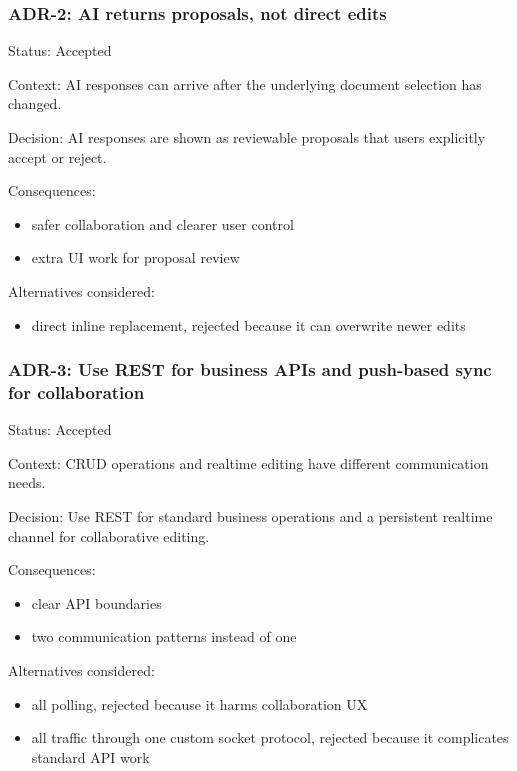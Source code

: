 \documentclass[a4paper]{article}
\providecommand{\tightlist}{%
  \setlength{\itemsep}{0pt}\setlength{\parskip}{0pt}}
\begin{document}
\subsubsection{ADR-2: AI returns proposals, not direct
edits}\label{adr-2-ai-returns-proposals-not-direct-edits}

Status: Accepted

Context: AI responses can arrive after the underlying document selection
has changed.

Decision: AI responses are shown as reviewable proposals that users
explicitly accept or reject.

Consequences:

\begin{itemize}
\tightlist
\item
  safer collaboration and clearer user control
\item
  extra UI work for proposal review
\end{itemize}

Alternatives considered:

\begin{itemize}
\tightlist
\item
  direct inline replacement, rejected because it can overwrite newer
  edits
\end{itemize}

\subsubsection{ADR-3: Use REST for business APIs and push-based sync for
collaboration}\label{adr-3-use-rest-for-business-apis-and-push-based-sync-for-collaboration}

Status: Accepted

Context: CRUD operations and realtime editing have different
communication needs.

Decision: Use REST for standard business operations and a persistent
realtime channel for collaborative editing.

Consequences:

\begin{itemize}
\tightlist
\item
  clear API boundaries
\item
  two communication patterns instead of one
\end{itemize}

Alternatives considered:

\begin{itemize}
\tightlist
\item
  all polling, rejected because it harms collaboration UX
\item
  all traffic through one custom socket protocol, rejected because it
  complicates standard API work
\end{itemize}
\end{document}
